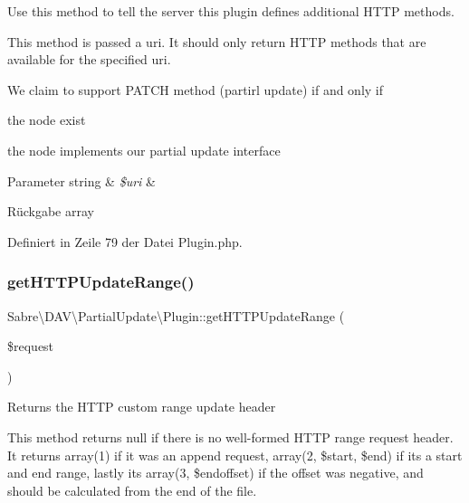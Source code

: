 Use this method to tell the server this plugin defines additional H\+T\+TP methods.

This method is passed a uri. It should only return H\+T\+TP methods that are available for the specified uri.

We claim to support P\+A\+T\+CH method (partirl update) if and only if
\begin{DoxyItemize}
\item the node exist
\item the node implements our partial update interface
\end{DoxyItemize}


\begin{DoxyParams}[1]{Parameter}
string & {\em \$uri} & \\
\hline
\end{DoxyParams}
\begin{DoxyReturn}{Rückgabe}
array 
\end{DoxyReturn}


Definiert in Zeile 79 der Datei Plugin.\+php.

\mbox{\label{class_sabre_1_1_d_a_v_1_1_partial_update_1_1_plugin_a2e4032369857168f76293ca270d71e2f}} 
\subsubsection{\texorpdfstring{get\+H\+T\+T\+P\+Update\+Range()}{getHTTPUpdateRange()}}
{\footnotesize\ttfamily Sabre\textbackslash{}\+D\+A\+V\textbackslash{}\+Partial\+Update\textbackslash{}\+Plugin\+::get\+H\+T\+T\+P\+Update\+Range (\begin{DoxyParamCaption}\item[{\mbox{\hyperlink{interface_sabre_1_1_h_t_t_p_1_1_request_interface}{Request\+Interface}}}]{\$request }\end{DoxyParamCaption})}

Returns the H\+T\+TP custom range update header

This method returns null if there is no well-\/formed H\+T\+TP range request header. It returns array(1) if it was an append request, array(2, \$start, \$end) if it\textquotesingle{}s a start and end range, lastly it\textquotesingle{}s array(3, \$endoffset) if the offset was negative, and should be calculated from the end of the file.

